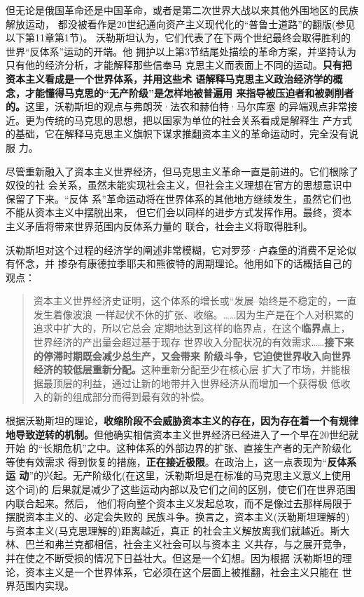 但无论是俄国革命还是中国革命，或者是第二次世界大战以来其他外围地区的民族解放运动，
都没被看作是20世纪通向资产主义现代化的“普鲁士道路”的翻版(参见以下第11章第1节)。
沃勒斯坦认为，它们代表了在下两个世纪最终会取得胜利的世界“反体系”运动的开端。他
拥护以上第3节结尾处描绘的革命方案，并坚持认为只有他的经济分析，才能解释那些信奉马
克思主义而表面上不同的运动。\textbf{只有把资本主义看成是一个世界体系，并用这些术
  语解释马克思主义政治经济学的概念，才能懂得马克思的“无产阶级”是怎样地被普遍用
  来指导被压迫者和被剥削者的。}这里，沃勒斯坦的观点与弗朗茨·法农和赫伯特·马尔库塞
的异端观点非常接近。更为传统的马克思的思想，把以国家为单位的社会关系看成是解释生
产方式的基础，它在解释马克思主义旗帜下谋求推翻资本主义的革命运动时，完全没有说服
力。

尽管重新融入了资本主义世界经济，但马克思主义革命一直是前进的。它们根除了奴役的社
会关系，虽然未能实现社会主义，但社会主义理想在官方的思想意识中保留了下来。“反体
系”革命运动将在世界体系的其他地方继续发生，虽然它们也不能从资本主义中摆脱出来，
但它们会以同样的进步方式发挥作用。最终，资本主义矛盾将带来世界范围内反体系力量的
联合，社会主义将取得胜利。

沃勒斯坦对这个过程的经济学的阐述非常模糊，它对罗莎·卢森堡的消费不足论似有怀念，并
掺杂有康德拉季耶夫和熊彼特的周期理论。他用如下的话概括自己的观点：

\begin{quotation}
  资本主义世界经济史证明，这个体系的增长或“发展–始终是不稳定的，一直发生着像波浪
  一样起伏不休的扩张、收缩。……因为生产是在个人对积累的追求中扩大的，所以它总会
  定期地达到这样的临界点，在这个\textbf{临界点}上，世界经济的产出量会超过基于现存
  世界收入分配状况的有效需求……\textbf{接下来的停滞时期既会减少总生产，又会带来
    阶级斗争，它迫使世界收入向世界经济的较低层重新分配。}这种重新分配至少在核心层
  扩大了市场，并能根据最顶层的利益，通过让新的地带并入世界经济从而增加一个获得极
  低收入的新的组成部分而得到最有效的补偿。
\end{quotation}

根据沃勒斯坦的理论，\textbf{收缩阶段不会威胁资本主义的存在，因为存在着一个有规律
  地导致逆转的机制。}但他确实相信资本主义世界经济已经进入了一个早在20世纪就开始
的“长期危机”之中。这种体系的外部边界的扩张、直接生产者的无产阶级化等使有效需求
得到恢复的措施，\textbf{正在接近极限}。在政治上，这一点表现为“\textbf{反体系运
  动}”的兴起。无产阶级化(在这里，沃勒斯坦是在标准的马克思主义意义上使用这个词)的
后果就是减少了这些运动内部以及它们之间的区别，使它们在世界范围内联合起来。然后，
他们将向整个资本主义发起总攻，而不是像过去那样局限于摆脱资本主义的、必定会失败的
民族斗争。换言之，资本主义(沃勒斯坦理解的)与资本主义(马克思理解的)距离越近，真正
的社会主义解放离我们就越近。斯大林、巴兰和弗兰克都相信，社会主义社会可以与资本主
义共存，与之展开竞争，并在使之不断受损的情况下日益壮大。但这是一个幻想。因为根据
沃勒斯坦的理论，资本主义是一个世界体系，它必须在这个层面上被推翻，社会主义只能在
世界范围内实现。


